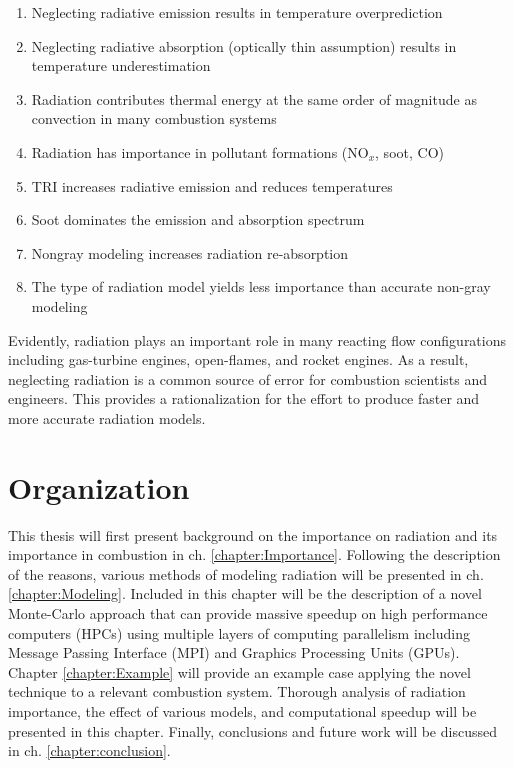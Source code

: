 \begin{enumerate}
    \item Neglecting radiative emission results in temperature overprediction \cite{Gamil2020AssessmentChamber}
    \item Neglecting radiative absorption (optically thin assumption) results in temperature underestimation
    \item Radiation contributes thermal energy at the same order of magnitude as convection in many combustion systems \cite{Gamil2020AssessmentChamber,Johnson2021AnalysisMethod}
    \item Radiation has importance in pollutant formations (NO${}_x$, soot, CO) \cite{Ihme2008ModelingFormulation,Habibi2007TurbulenceFlames}
    \item TRI increases radiative emission and reduces temperatures
    \item Soot dominates the emission and absorption spectrum
    \item Nongray modeling increases radiation re-absorption \cite{Wu2021LimitationsFires}
    \item The type of radiation model yields less importance than accurate non-gray modeling
\end{enumerate}

Evidently, radiation plays an important role in many reacting flow configurations including gas-turbine engines, open-flames, and rocket engines.
As a result, neglecting radiation is a common source of error for combustion scientists and engineers. 
This provides a rationalization for the effort to produce faster and more accurate radiation models.


\section{Organization}
This thesis will first present background on the importance on radiation and its importance in combustion in ch. \ref{chapter:Importance}. 
Following the description of the reasons, various methods of modeling radiation will be presented in ch. \ref{chapter:Modeling}. Included in this chapter will be the description of a novel Monte-Carlo approach that can provide massive speedup on high performance computers (HPCs) using multiple layers of computing parallelism including Message Passing Interface (MPI) and Graphics Processing Units (GPUs).
Chapter \ref{chapter:Example} will provide an example case applying the novel technique to a relevant combustion system. Thorough analysis of radiation importance, the effect of various models, and computational speedup will be presented in this chapter.
Finally, conclusions and future work will be discussed in ch. \ref{chapter:conclusion}.
